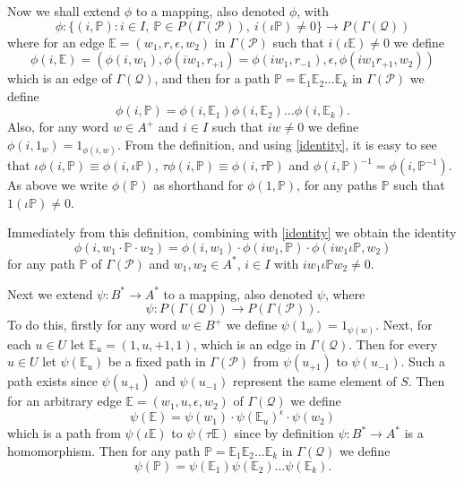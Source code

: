 \documentclass[11pt]{amsart}
\theoremstyle{plain}
\begin{document}
Now we shall extend $\phi$ to a mapping, also denoted $\phi$, with
\[
\phi: \{ (i,{\mathbb{P}}): i \in I, \ {\mathbb{P}} \in P(\Gamma(\mathcal{P})), \ i (\iota {\mathbb{P}}) \neq 0  \}
\rightarrow P(\Gamma(\mathcal{Q}))
\]
where for an edge ${\mathbb{E}} = (w_1, r, \epsilon, w_2)$ in $\Gamma(\mathcal{P})$ such that $i (\iota {\mathbb{E}}) \neq 0$ we define
\[
\phi(i, \mathbb{E}) =
(  \phi(i,w_1), \phi(i w_1, r_{+1}) = \phi(i w_1, r_{-1}), \epsilon, \phi(i w_1 r_{+1}, w_2)  )
\]
which is an edge of $\Gamma(\mathcal{Q})$, and then for a path ${\mathbb{P}} = {\mathbb{E}}_1 {\mathbb{E}}_2 \ldots {\mathbb{E}}_k$ in $\Gamma(\mathcal{P})$ we define
\[
\phi(i, {\mathbb{P}}) = \phi(i, {\mathbb{E}}_1) \phi(i, {\mathbb{E}}_2) \ldots \phi(i, {\mathbb{E}}_k).
\]
Also, for any word $w \in A^+$ and $i \in I$ such that $iw \neq 0$ we define $\phi(i,1_w) = 1_{\phi(i,w)}$. From the definition, and using \eqref{identity}, it is easy to see that $\iota \phi(i, {\mathbb{P}}) \equiv \phi(i, \iota {\mathbb{P}})$, $\tau \phi(i, {\mathbb{P}}) \equiv \phi(i, \tau {\mathbb{P}})$ and $\phi(i,{\mathbb{P}})^{-1} = \phi(i,{\mathbb{P}}^{-1})$. As above we write $\phi({\mathbb{P}})$ as shorthand for $\phi(1,{\mathbb{P}})$, for any paths ${\mathbb{P}}$ such that $1(\iota {\mathbb{P}}) \neq 0$. 

Immediately from this definition, combining with \eqref{identity} we obtain the identity
\begin{equation} \label{pathidentity}
\phi(i, w_1 \cdot \mathbb{P} \cdot w_2) =
\phi(i, w_1) \cdot \phi(i w_1, \mathbb{P}) \cdot \phi(i w_1 \iota \mathbb{P}, w_2)
\end{equation}
for any path $\mathbb{P}$ of $\Gamma(\mathcal{P})$ and $w_1, w_2 \in A^*$, $i \in I$ with $i w_1 \iota \mathbb{P} w_2 \neq 0$.

Next we extend $\psi: B^* \rightarrow A^*$ to a mapping, also denoted $\psi$, where
\[
\psi : P(\Gamma(\mathcal{Q})) \rightarrow P(\Gamma(\mathcal{P})).
\]
To do this, firstly for any word $w \in B^+$ we define $\psi(1_w) = 1_{\psi(w)}$. 
Next, for each $u \in U$ let ${\mathbb{E}}_u = (1,u,+1,1)$, which is an edge in $\Gamma(\mathcal{Q})$. Then for every $u \in U$ let $\psi({\mathbb{E}}_u)$ be a fixed path in $\Gamma(\mathcal{P})$ from $\psi(u_{+1})$ to $\psi(u_{-1})$. Such a path exists since $\psi(u_{+1})$ and $\psi(u_{-1})$ represent the same element of $S$. Then for an arbitrary edge ${\mathbb{E}} = (w_1,u,\epsilon,w_2)$ of $\Gamma(\mathcal{Q})$ we define
\[
\psi({\mathbb{E}}) = \psi(w_1) \cdot \psi({\mathbb{E}}_u)^{\epsilon} \cdot \psi(w_2)
\]
which is a path from $\psi(\iota {\mathbb{E}})$ to $\psi( \tau {\mathbb{E}})$ since by definition $\psi : B^* \rightarrow A^*$ is a homomorphism. Then for any path ${\mathbb{P}} = {\mathbb{E}}_1 {\mathbb{E}}_2 \ldots {\mathbb{E}}_k$ in $\Gamma(\mathcal{Q})$ we define
\[
\psi({\mathbb{P}}) = \psi({\mathbb{E}}_1) \psi({\mathbb{E}}_2) \ldots \psi({\mathbb{E}}_k).
\]
\end{document}

